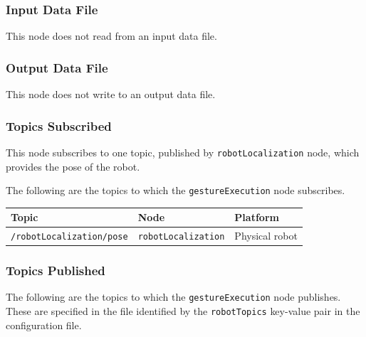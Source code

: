 \documentclass{CSSRforAfrica}
\begin{document}
{{\subsubsection*{Input Data File}
This node does not read from an input data file.


\subsubsection*{Output Data File}
This node does not write to an output data file.

\newpage

\subsubsection*{Topics Subscribed}
This node  subscribes to one topic, published by {\small \verb+robotLocalization+} node, which provides the pose of the robot.

The following are the topics to which the {\small \verb+gestureExecution+} node subscribes.

\begin{center}
\begin{tabularx}{\linewidth}{| l | l | X|}
\hline 
{\small Topic }                               & {\small Node }                            &  {\small Platform}       \\
\hline
{\footnotesize \verb+/robotLocalization/pose+ }  & {\footnotesize \verb+robotLocalization+}    & {\small Physical robot} \\ 
\hline
\end{tabularx}
\end{center}


\subsubsection*{Topics Published}

The following are the topics to which the {\small \verb+gestureExecution+} node publishes.
These are specified in the file identified by the {\small \verb+robotTopics+ }    key-value pair in the configuration file.

}}
\end{document}
